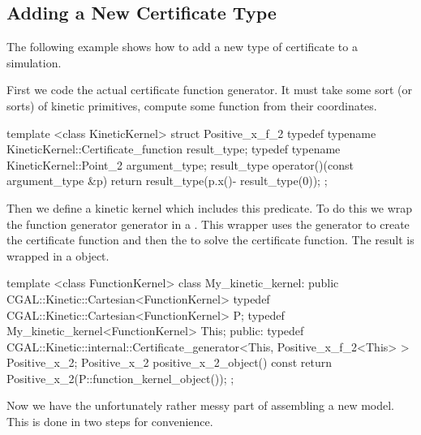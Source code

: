 \subsection{Adding a New Certificate Type\label{sec:kds_add_cert}}


The following example shows how to add a new type of certificate to a simulation. 

First we code the actual certificate function generator. It must take
some sort (or sorts) of kinetic primitives, compute some function from
their coordinates.

\begin{ccExampleCode}
template <class KineticKernel>
struct Positive_x_f_2 {
  typedef typename KineticKernel::Certificate_function result_type;
  typedef typename KineticKernel::Point_2 argument_type;
  result_type operator()(const argument_type &p){
    return result_type(p.x()- result_type(0));
  }
};
\end{ccExampleCode}

Then we define a kinetic kernel which includes this predicate. To do
this we wrap the function generator generator in a
.
This wrapper uses the generator to create the certificate function and
then the  to solve the certificate
function. The result is wrapped in a 
object.

\begin{ccExampleCode}
template <class FunctionKernel> 
class My_kinetic_kernel:
  public CGAL::Kinetic::Cartesian<FunctionKernel> {
  typedef CGAL::Kinetic::Cartesian<FunctionKernel> P;
  typedef My_kinetic_kernel<FunctionKernel> This;
public:
  typedef CGAL::Kinetic::internal::Certificate_generator<This, Positive_x_f_2<This> > Positive_x_2;
  Positive_x_2 positive_x_2_object() const
  {
    return Positive_x_2(P::function_kernel_object());
  }
};
\end{ccExampleCode}

Now we have the unfortunately rather messy part of assembling a new
 model. This is done in two steps for convenience.


